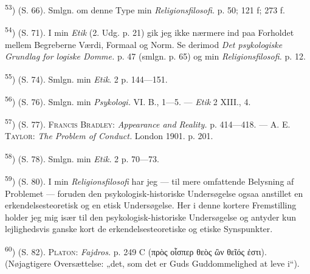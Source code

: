 \documentclass[12pt,a4paper,openany]{book}
\begin{document}
\begin{small}
\textsuperscript{53}) (S. 66). Smlgn. om denne Type min
\textit{Religionsfilosofi.} p. 50; 121 f; 273 f.

\textsuperscript{54}) (S. 71). I min \textit{Etik} (2. Udg. p. 21) gik jeg ikke
nærmere ind paa Forholdet mellem Begreberne Værdi, Formaal og Norm. Se derimod
\textit{Det psykologiske Grundlag for logiske Domme.} p. 47 (smlgn. p. 65) og
min \textit{Religionsfilosofi.} p. 12.

\textsuperscript{55}) (S. 74). Smlgn. min \textit{Etik}. 2 p. 144---151.

\textsuperscript{56}) (S. 76). Smlgn. min \textit{Psykologi.} VI. B., 1---5.
--- \textit{Etik} 2 XIII., 4.

\textsuperscript{57}) (S. 77). \textsc{Francis Bradley}: \textit{Appearance and
Reality.} p. 414---418. --- \textsc{A. E. Taylor}: \textit{The Problem of
Conduct.} London 1901. p. 201.

\textsuperscript{58}) (S. 78). Smlgn. min \textit{Etik.} 2 p. 70---73.

\textsuperscript{59}) (S. 80). I min \textit{Religionsfilosofi} har jeg --- til
mere omfattende Belysning af Problemet --- foruden den psykologisk-historiske
Undersøgelse ogsaa anstillet en erkendelsesteoretisk og en etisk Undersøgelse.
Her i denne kortere Fremstilling holder jeg mig især til den
psykologisk-historiske Undersøgelse og antyder kun lejlighedsvis ganske kort de
erkendelsesteoretiske og etiske Synspunkter.

\textsuperscript{60}) (S. 82). \textsc{Platon}: \textit{Fajdros.} p. 249 C
(πρὸς οἷσπερ θεὸς ὢν θεῖός ἐστι). (Nøjagtigere Oversættelse: „det, som det er
Guds Guddommelighed at leve i“).
\end{small}
\end{document}

